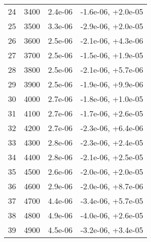 \begin{table}
\begin{adjustbox}{width=1\textwidth/2}
\begin{tabular}{|c|c|c|c|}
\cline{1-4}
24 & 3400 & 2.4e-06 & -1.6e-06, +2.0e-05 \\
\cline{1-4}
25 & 3500 & 3.3e-06 & -2.9e-06, +2.0e-05 \\
\cline{1-4}
26 & 3600 & 2.5e-06 & -2.1e-06, +4.3e-06 \\
\cline{1-4}
27 & 3700 & 2.5e-06 & -1.5e-06, +1.9e-05 \\
\cline{1-4}
28 & 3800 & 2.5e-06 & -2.1e-06, +5.7e-06 \\
\cline{1-4}
29 & 3900 & 2.5e-06 & -1.9e-06, +9.9e-06 \\
\cline{1-4}
30 & 4000 & 2.7e-06 & -1.8e-06, +1.0e-05 \\
\cline{1-4}
31 & 4100 & 2.7e-06 & -1.7e-06, +2.6e-05 \\
\cline{1-4}
32 & 4200 & 2.7e-06 & -2.3e-06, +6.4e-06 \\
\cline{1-4}
33 & 4300 & 2.8e-06 & -2.3e-06, +2.4e-05 \\
\cline{1-4}
34 & 4400 & 2.8e-06 & -2.1e-06, +2.5e-05 \\
\cline{1-4}
35 & 4500 & 2.6e-06 & -2.0e-06, +2.0e-05 \\
\cline{1-4}
36 & 4600 & 2.9e-06 & -2.0e-06, +8.7e-06 \\
\cline{1-4}
37 & 4700 & 4.4e-06 & -3.4e-06, +5.7e-05 \\
\cline{1-4}
38 & 4800 & 4.9e-06 & -4.0e-06, +2.6e-05 \\
\cline{1-4}
39 & 4900 & 4.5e-06 & -3.2e-06, +3.4e-05 \\
\cline{1-4}
\end{tabular}
\end{adjustbox}
\end{table}

